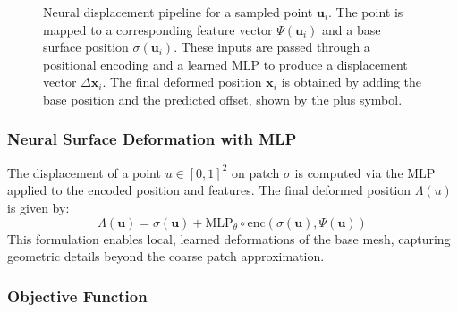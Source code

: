 \begin{figure}[ht]
\begin{adjustbox}{center}
  \end{adjustbox}
  \caption{Neural displacement pipeline for a sampled point $\mathbf{u}_i$. The point is mapped to a corresponding feature vector $\Psi(\mathbf{u}_i)$ and a base surface position $\sigma(\mathbf{u}_i)$. These inputs are passed through a positional encoding and a learned MLP to produce a displacement vector $\Delta \mathbf{x}_i$. The final deformed position $\mathbf{x}_i$ is obtained by adding the base position and the predicted offset, shown by the plus symbol.}
  \label{fig:neural_displacement}
\end{figure}





\subsubsection{Neural Surface Deformation with MLP}

The displacement of a point $u \in [0,1]^2$ on patch $\sigma$ is computed via the MLP applied to the encoded position and features.  
The final deformed position $\Lambda(u)$ is given by:  
\[\Lambda(\mathbf{u}) = \sigma(\mathbf{u}) + \text{MLP}_\theta \circ \text{enc}(\sigma(\mathbf{u}), \Psi(\mathbf{u})) \tag{4}\]
This formulation enables local, learned deformations of the base mesh, capturing geometric details beyond the coarse patch approximation.  





\subsubsection{Objective Function}

